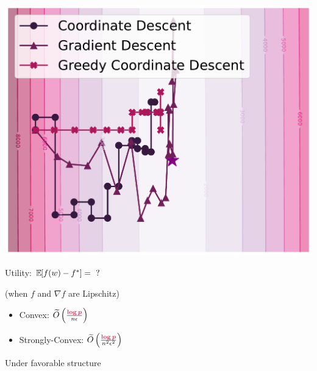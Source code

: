 \documentclass{beamer}
\begin{document}
\hspace{-3.3em}
\begin{frame}
  \vspace{-0.3em}
  \includegraphics[width=1.17\textwidth]{example_3.pdf}
\end{frame}





\begin{frame}
  \Huge
  Utility: $\mathbb E_{} \hspace{-0.29em} \left[ f(w) - f^* \right] = \text{ ?}$

  \vspace{0.5em}
  {
    \begin{center}
      \huge   (when $f$ and $\nabla f$ are Lipschitz)
    \end{center}
  }

  \vspace{1em}
  \begin{itemize}
  \item Convex: $\widetilde O\left( \frac{\emphcol{\log{p}}}{n\epsilon} \right)$
  \item Strongly-Convex:  $\widetilde O\left( \frac{\emphcol{\log{p}}}{n^2\epsilon^2} \right)$
  \end{itemize}

  \vspace{0.5em}

  \huge
  Under favorable structure

\end{frame}

\end{document}

